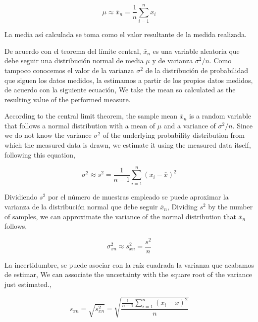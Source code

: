 \begin{equation*}
\mu \approx \bar{x}_n = \frac{1}{n}\sum_{i=1}^n x_i
\end{equation*}

\begin{paracol}{2}
La media así calculada se toma como el valor resultante de la medida realizada.

De acuerdo con el teorema del límite central, $\bar{x}_n$ es una variable aleatoria que debe seguir una distribución normal de media $\mu$ y de varianza $\sigma^2/n$. Como tampoco conocemos el valor de la varianza $\sigma^2$ de la distribución de probabilidad que siguen los datos medidos, la estimamos a partir de los propios datos medidos, de acuerdo con la siguiente ecuación,
\switchcolumn
We take the mean so calculated as the resulting value of the performed measure.

According to the central limit theorem, the sample mean $\bar{x}_n$ is a random variable that follows a normal distribution with a mean of $\mu$ and a variance of $\sigma^2/n$. Since we do not know the variance $\sigma^2$ of the underlying probability distribution from which the measured data is drawn, we estimate it using the measured data itself, following this equation,
\end{paracol}

\begin{equation*}
\sigma^2 \approx s^2 = \frac{1}{n-1}\sum_{i=1}^n(x_i-\bar{x})^2
\end{equation*}

\begin{paracol}{2}
Dividiendo $s^2$ por el número de muestras empleado se puede aproximar la varianza de la distribución normal que debe seguir $\bar{x}_n$,
\switchcolumn
Dividing $s^2$ by the number of samples, we can approximate the variance of the normal distribution  that $\bar{x}_n$ follows, 
\end{paracol}
\begin{equation*}
\sigma^2_{xn} \approx s^2_{xn} = \frac{s^2}{n}
\end{equation*}

\begin{paracol}{2}
La incertidumbre, se puede asociar con la raíz cuadrada la varianza que acabamos de estimar,
\switchcolumn
We can associate the uncertainty with the square root of the variance just estimated.,
\end{paracol}
\begin{equation*}
s_{xn}=\sqrt{s^2_{xn}}=\sqrt{\frac{\frac{1}{n-1}\sum_{i=1}^n(x_i-\bar{x})^2}{n}}
\end{equation*}

